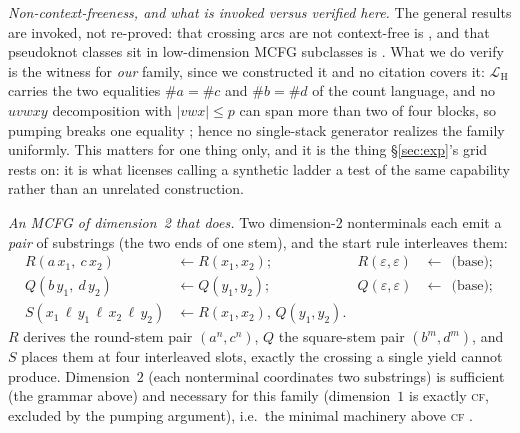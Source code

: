 \documentclass[11pt]{article}
\newcommand{\CF}{\textsc{cf}}
\begin{document}
\smallskip\noindent\emph{Non-context-freeness, and what is invoked versus verified here.} The general results
are invoked, not re-proved: that crossing arcs are not context-free is \citet{nebelweinberg}, and that
pseudoknot classes sit in low-dimension MCFG subclasses is \citet{katosekikasami2006}. What we do verify is the
witness for \emph{our} family, since we constructed it and no citation covers it: $\mathcal L_{\mathrm H}$
carries the two equalities $\#a{=}\#c$ and $\#b{=}\#d$ of the count language, and no
$uvwxy$ decomposition with $|vwx|\le p$ can span more than two of four blocks, so pumping breaks one equality
\citep{ogden1968,hopcroftullman1979}; hence no single-stack generator realizes the family uniformly. This
matters for one thing only, and it is the thing \S\ref{sec:exp}'s grid rests on: it is what licenses calling a
synthetic ladder a test of the same capability rather than an unrelated construction.

\smallskip\noindent\emph{An MCFG of dimension~2 that does.} Two dimension-2 nonterminals each emit a
\emph{pair} of substrings (the two ends of one stem), and the start rule interleaves them:
\begin{align}\label{eq:mcfg}
  R(a\,x_1,\ c\,x_2) &\leftarrow R(x_1,x_2); &  R(\varepsilon,\varepsilon) &\leftarrow \ \ \text{(base)};
  \nonumber\\
  Q(b\,y_1,\ d\,y_2) &\leftarrow Q(y_1,y_2); &  Q(\varepsilon,\varepsilon) &\leftarrow \ \ \text{(base)};\\
  S(x_1\,\ell\,y_1\,\ell\,x_2\,\ell\,y_2) &\leftarrow R(x_1,x_2),\,Q(y_1,y_2). && \nonumber
\end{align}
$R$ derives the round-stem pair $(a^n,c^n)$, $Q$ the square-stem pair $(b^m,d^m)$, and $S$ places them at four
interleaved slots, exactly the crossing a single yield cannot produce. Dimension~$2$ (each nonterminal
coordinates two substrings) is sufficient (the grammar above) and necessary for this family (dimension~$1$ is
exactly \CF, excluded by the pumping argument), i.e.\ the minimal machinery above
\CF{} \citep{seki1991mcfg,katosekikasami2006}.
\end{document}
